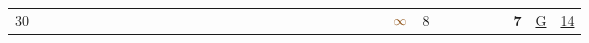 \begin{landscape}
\begin{table}
\begin{adjustwidth}{-2.6cm}{}
{\begin{tabular}{l|lllllllllllllllllllllllllllllllll|ll}
		30   &            &                                                                 &                                                                 &                                                                 &                                                                 &                                                                 &                                                                 &                                                                 &                                                                 &                                                                 &                                                                 &                                                                 &                                                                 &                                                                 &                                                                 &                                                                 &                                                                 &                                                                 &                                                                 &                                                                 &                                                                 &                                                                 &                                                                 &                                                                 &                                                                 & $\textcolor[rgb]{0.541,0.29,0.043}{\infty}$ & 8                                                               &                                                                 &                                                                 &                                                                 &                                                                 &                                                                 & \textbf{7}                                                      & \uline{G}  & \uline{14}  \\

\end{tabular}}
\end{adjustwidth}
\end{table}
\end{landscape}
